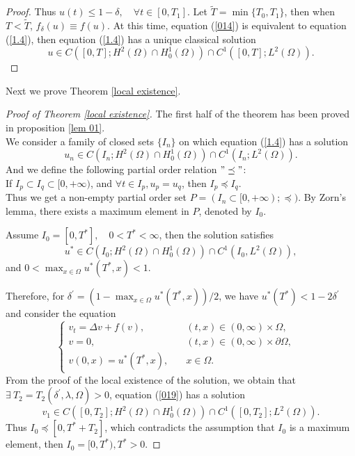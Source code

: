 \documentclass{article}
\numberwithin{equation}{section}
\begin{document}
\begin{proof}
    Thus $u(t)\le 1-\delta ,\quad \forall t\in [0, T_1]$. Let $\widetilde{T}=\min\{T_0, T_1\}$, then when $T<\widetilde{T}$, $f_\delta(u)\equiv f(u)$. At this time, equation (\ref{014}) is equivalent to equation (\ref{1.4}), then equation (\ref{1.4}) has a unique classical solution
    \begin{equation*}
        u \in C\left([0, T]; H^{2}(\Omega) \cap H_{0}^{1}(\Omega)\right) \cap C^{1}\left([0, T];  L^{2}(\Omega)\right).
    \end{equation*}
\end{proof}

Next we prove Theorem \ref{local existence}.

\begin{proof}[Proof of Theorem \ref{local existence}]
    The first half of the theorem has been proved in proposition \ref{lem 01}.\\
    We consider a family of closed sets $\{I_n\}$ on which equation (\ref{1.4}) has a solution
    $$u_n\in C\left(I_n; H^{2}(\Omega) \cap H_{0}^{1}(\Omega)\right) \cap C^{1}\left(I_n;  L^{2}(\Omega)\right).$$
And we define the following partial order relation $"\preceq"$:\\
If $I_p\subset I_q\subset [0, +\infty)$, and $\forall t\in I_p, u_p=u_q$, then $I_p\preceq I_q$.\\
Thus we get a non-empty partial order set $P=(I_n\subset[0, +\infty);\preceq)$. By Zorn's lemma, there exists a maximum element in $P$, denoted by $I_0$.

Assume $I_0=[0, T^*],\quad 0<T^*<\infty$, then the solution satisfies
$$u^{*}\in C\left(I_0; H^{2}(\Omega) \cap H_{0}^{1}(\Omega)\right) \cap C^{1}\left(I_0,  L^{2}(\Omega)\right),$$
and $\displaystyle 0<\max_{x\in \Omega}u^{*}{(T^*, x )}<1$.

Therefore, for $\displaystyle \delta^{'}=(1-\max_{x\in \Omega}u^{*}{(T^*, x)})/2$, we have $u^{*}(T^*)<1-2\delta^{'}$ and consider the equation
\begin{equation}
\left\{\begin{array}{lll}
 v_{t}=\Delta v+f(v),\quad &(t,x) \in  (0, \infty)\times\Omega,
\\    v=0 ,\quad&(t,x) \in (0, \infty)\times \partial \Omega, 	
\\  v(0, x)=u^{*}(T^*, x),\quad & x \in \Omega.
\end{array}\quad \right. \label{019}
\end{equation}
From the proof of the local existence of the solution, we obtain that $\exists\  T_2=T_2(\delta^{'}, \lambda, \Omega)>0$, equation (\ref{019}) has a solution
$$v_1\in C\left([0, T_2]; H^{2}(\Omega) \cap H_{0}^{1}(\Omega)\right) \cap C^{1}\left([0, T_2];  L^{2}(\Omega)\right).$$
Thus $I_0\preceq[0, T^*+T_2]$, which contradicts the assumption that $I_0$ is a maximum element, then $I_0=[0, T^*), T^*>0$.


\end{proof}
\end{document}
